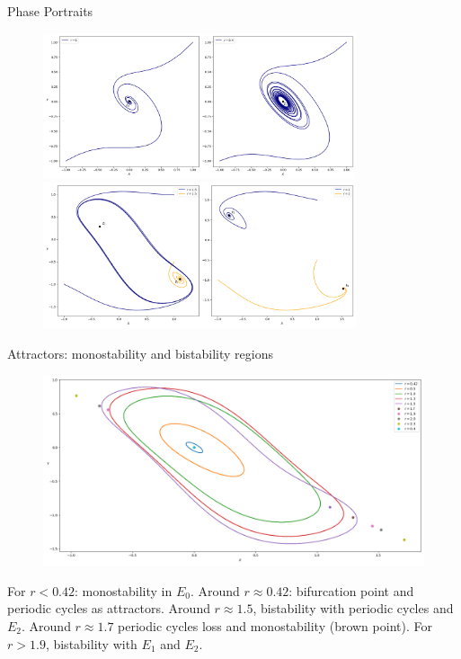 \documentclass[10pt]{beamer}
\begin{document}
\begin{frame}{Phase Portraits}
	\begin{figure}
		\includegraphics[width=0.82\textwidth, height=0.7\textheight,keepaspectratio]{./figures_2/r0-0.4-noiseless-trajectories.png}
		\includegraphics[width=0.82\textwidth, height=0.7\textheight,keepaspectratio]{./figures_2/r1.5-2-noiseless-trajectories.png}
	\end{figure}
\end{frame}

\begin{frame}{Attractors: monostability and bistability regions}
	\begin{figure}
		\includegraphics[width=\textwidth, height=\textheight,keepaspectratio]{./figures_2/noiseless-attractors.png}
	\end{figure}

	For $r<0.42$: monostability in $E_0$.
	Around $r\approx 0.42$: bifurcation point and periodic cycles as attractors.
	Around $r\approx1.5$, bistability with periodic cycles and $E_2$.
	Around $r\approx1.7$ periodic cycles loss and monostability (brown point).
	For $r>1.9$, bistability with $E_1$ and $E_2$.
\end{frame}
\end{document}
